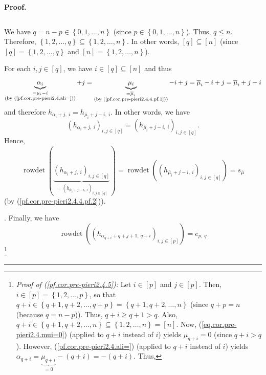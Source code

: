 \documentclass
[numbers=enddot,12pt,final,onecolumn,notitlepage,english]{scrartcl}%
\theoremstyle{definition}
\newenvironment{proof}[1][Proof]{\noindent\textbf{#1.} }{\ \rule{0.5em}{0.5em}}
\newenvironment{verlong}{}{}
\begin{document}
\begin{verlong}
\begin{proof}
{\begin{equation}
\end{equation}
\par
We have $q=n-p\in\left\{  0,1,\ldots,n\right\}  $ (since $p\in\left\{
0,1,\ldots,n\right\}  $). Thus, $q\leq n$. Therefore, $\left\{  1,2,\ldots
,q\right\}  \subseteq\left\{  1,2,\ldots,n\right\}  $. In other words,
$\left[  q\right]  \subseteq\left[  n\right]  $ (since $\left[  q\right]
=\left\{  1,2,\ldots,q\right\}  $ and $\left[  n\right]  =\left\{
1,2,\ldots,n\right\}  $).
\par
For each $i,j\in\left[  q\right]  $, we have $i\in\left[  q\right]
\subseteq\left[  n\right]  $ and thus%
\[
\underbrace{\alpha_{i}}_{\substack{=\mu_{i}-i\\\text{(by
(\ref{pf.cor.pre-pieri2.4.ali=}))}}}+j=\underbrace{\mu_{i}}%
_{\substack{=\overline{\mu}_{i}\\\text{(by (\ref{pf.cor.pre-pieri2.4.4.pf.1}%
))}}}-i+j=\overline{\mu}_{i}-i+j=\overline{\mu}_{i}+j-i
\]
and therefore $h_{\alpha_{i}+j,\ i}=h_{\overline{\mu}_{i}+j-i,\ i}$. In other
words, we have
\[
\left(  h_{\alpha_{i}+j,\ i}\right)  _{i,j\in\left[  q\right]  }=\left(
h_{\overline{\mu}_{i}+j-i,\ i}\right)  _{i,j\in\left[  q\right]  }.
\]
Hence,%
\[
\operatorname*{rowdet}\left(  \underbrace{\left(  h_{\alpha_{i}+j,\ i}\right)
_{i,j\in\left[  q\right]  }}_{=\left(  h_{\overline{\mu}_{i}+j-i,\ i}\right)
_{i,j\in\left[  q\right]  }}\right)  =\operatorname*{rowdet}\left(  \left(
h_{\overline{\mu}_{i}+j-i,\ i}\right)  _{i,j\in\left[  q\right]  }\right)
=s_{\overline{\mu}}%
\]
(by (\ref{pf.cor.pre-pieri2.4.4.pf.2})).}. Finally, we have%
\begin{equation}
\operatorname*{rowdet}\left(  \left(  h_{\alpha_{q+i}+q+j+1,\ q+i}\right)
_{i,j\in\left[  p\right]  }\right)  =e_{p,\ q} \label{pf.cor.pre-pieri2.4.5}%
\end{equation}
\footnote{\textit{Proof of (\ref{pf.cor.pre-pieri2.4.5}):} Let $i\in\left[
p\right]  $ and $j\in\left[  p\right]  $. Then, $i\in\left[  p\right]
=\left\{  1,2,\ldots,p\right\}  $, so that $q+i\in\left\{  q+1,q+2,\ldots
,q+p\right\}  =\left\{  q+1,q+2,\ldots,n\right\}  $ (since $q+p=n$ (because
$q=n-p$)). Thus, $q+i\geq q+1>q$. Also, $q+i\in\left\{  q+1,q+2,\ldots
,n\right\}  \subseteq\left\{  1,2,\ldots,n\right\}  =\left[  n\right]  $. Now,
(\ref{eq.cor.pre-pieri2.4.mui=0}) (applied to $q+i$ instead of $i$) yields
$\mu_{q+i}=0$ (since $q+i>q$). However, (\ref{pf.cor.pre-pieri2.4.ali=})
(applied to $q+i$ instead of $i$) yields $\alpha_{q+i}=\underbrace{\mu_{q+i}%
}_{=0}-\left(  q+i\right)  =-\left(  q+i\right)  $. Thus,%
}
\end{proof}
\end{verlong}
\end{document}

